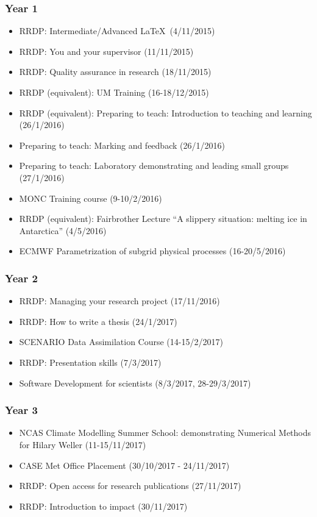 \documentclass[11pt,a4paper]{article}
\begin{document}
\subsubsection*{Year 1}

\begin{itemize}
  \item RRDP: Intermediate/Advanced \LaTeX\ (4/11/2015)
  \item RRDP: You and your supervisor (11/11/2015)
  \item RRDP: Quality assurance in research (18/11/2015)
  \item RRDP (equivalent): UM Training (16-18/12/2015)
  \item RRDP (equivalent): Preparing to teach: Introduction to teaching and learning (26/1/2016)
  \item Preparing to teach: Marking and feedback (26/1/2016)
  \item Preparing to teach: Laboratory demonstrating and leading small groups (27/1/2016)
  \item MONC Training course (9-10/2/2016)
  \item RRDP (equivalent): Fairbrother Lecture ``A slippery situation: melting ice in Antarctica'' (4/5/2016)
  \item ECMWF Parametrization of subgrid physical processes (16-20/5/2016)
\end{itemize}

\subsubsection*{Year 2}

\begin{itemize}
  \item RRDP: Managing your research project (17/11/2016)
  \item RRDP: How to write a thesis (24/1/2017)
  \item SCENARIO Data Assimilation Course (14-15/2/2017)
  \item RRDP: Presentation skills (7/3/2017)
  \item Software Development for scientists (8/3/2017, 28-29/3/2017)
\end{itemize}

\subsubsection*{Year 3}

\begin{itemize}
  \item NCAS Climate Modelling Summer School: demonstrating Numerical Methods for Hilary Weller (11-15/11/2017)
  \item CASE Met Office Placement (30/10/2017 - 24/11/2017)
  \item RRDP: Open access for research publications (27/11/2017)
  \item RRDP: Introduction to impact (30/11/2017)
\end{itemize}
\end{document}
